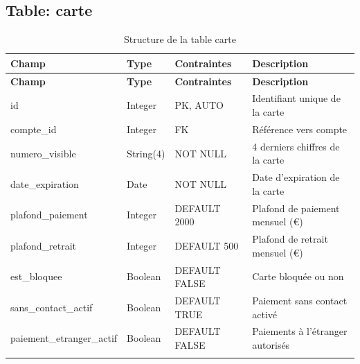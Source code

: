 \documentclass[12pt,a4paper]{report}
\begin{document}
\subsection{Table: carte}
\begin{longtable}{|p{3.5cm}|p{2.5cm}|p{2cm}|p{6cm}|}
\hline
\rowcolor{banquiseblue!30}
\textbf{Champ} & \textbf{Type} & \textbf{Contraintes} & \textbf{Description} \\
\hline
\endfirsthead
\hline
\rowcolor{banquiseblue!30}
\textbf{Champ} & \textbf{Type} & \textbf{Contraintes} & \textbf{Description} \\
\hline
\endhead

id & Integer & PK, AUTO & Identifiant unique de la carte \\
\hline
compte\_id & Integer & FK & Référence vers compte \\
\hline
numero\_visible & String(4) & NOT NULL & 4 derniers chiffres de la carte \\
\hline
date\_expiration & Date & NOT NULL & Date d'expiration de la carte \\
\hline
plafond\_paiement & Integer & DEFAULT 2000 & Plafond de paiement mensuel (€) \\
\hline
plafond\_retrait & Integer & DEFAULT 500 & Plafond de retrait mensuel (€) \\
\hline
est\_bloquee & Boolean & DEFAULT FALSE & Carte bloquée ou non \\
\hline
sans\_contact\_actif & Boolean & DEFAULT TRUE & Paiement sans contact activé \\
\hline
paiement\_etranger\_actif & Boolean & DEFAULT FALSE & Paiements à l'étranger autorisés \\
\hline

\caption{Structure de la table carte}
\end{longtable}
\end{document}
